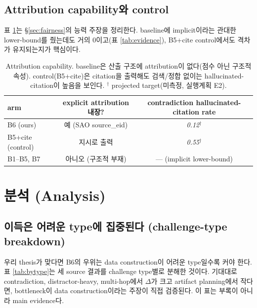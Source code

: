 \documentclass[11pt]{article}
\newcommand{\proj}[1]{\textit{#1}$^\dagger$} %
\begin{document}
\subsection{Attribution capability와 control}
표 \ref{tab:capability}는 \S\ref{sec:fairness}의 능력 주장을 정리한다. baseline에 implicit이라는
관대한 lower-bound를 줬는데도 거의 0이고(표 \ref{tab:evidence}), B5+cite control에서도 격차가
유지되는지가 핵심이다.

\begin{table}[h]
\centering\small
\begin{tabular}{lcc}
\toprule
arm & explicit attribution 내장? & contradiction hallucinated-citation rate \\
\midrule
B6 (ours) & 예 (SAO source\_eid) & \proj{0.12} \\
B5+cite (control) & 지시로 출력 & \proj{0.55} \\
B1--B5, B7 & 아니오 (구조적 부재) & --- (implicit lower-bound) \\
\bottomrule
\end{tabular}
\caption{Attribution capability. baseline은 산출 구조에 attribution이 없다(점수 아닌 구조적
속성). control(B5+cite)은 citation을 출력해도 검색/정합 없이는 hallucinated-citation이 높음을
보인다. $^\dagger$ projected target(미측정, 실행계획 E2).}
\label{tab:capability}
\end{table}

\section{분석 (Analysis)}
\label{sec:analysis}

\subsection{이득은 어려운 type에 집중된다 (challenge-type breakdown)}
우리 thesis가 맞다면 B6의 우위는 data construction이 어려운 type일수록 커야 한다. 표
\ref{tab:bytype}는 세 source 결과를 challenge type별로 분해한 것이다. 기대대로 contradiction,
distractor-heavy, multi-hop에서 $\Delta$가 크고 artifact planning에서 작다면, bottleneck이 data
construction이라는 주장이 직접 검증된다. 이 표는 부록이 아니라 main evidence다.
\end{document}
